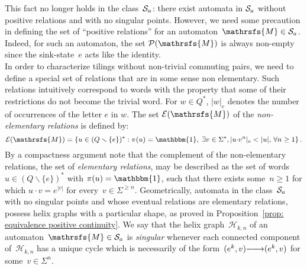\documentclass{amsart}
\begin{document}
{This fact no longer holds in the class~${\hbox{${\mathcal S}_{a}$}}$: there exist automata in ${\hbox{${\mathcal S}_{a}$}}$ without positive relations and with no singular points. However, we need some precaution in defining the set of
``positive relations'' for an automaton~${{{\mathrsfs{{M}}}}}\in{\hbox{${\mathcal S}_{a}$}}$.
Indeed, for such an automaton, the set 
${\mathcal{P}}({{{\mathrsfs{{M}}}}})$ is always non-empty since the sink-state~$e$ acts
like the identity. 
\\
In order to characterize tilings without non-trivial commuting pairs, we need to define a special set of relations that are in some sense non elementary. Such relations intuitively correspond to words with the property that some of their restrictions do not become the trivial word. For $w\in{{{Q}}}^{*} $, $|w|_{e}$ denotes the number of occurrences of the letter $e$ in $w$. The set $\mathcal{E}({{{\mathrsfs{{M}}}}})$ of the \emph{non-elementary relations} is defined by:
\[\mathcal{E}({{{\mathrsfs{{M}}}}})=\left\{u\in ({{{Q}}}\smallsetminus\{e\})^{*}: \pi(u)=\operatorname{\mathbbm{1}}, \;\exists v\in{{{\Sigma}}}^{*}, |u{{{\cdot}}} v^{n}|_{e}<|u|, \,\forall n\ge 1\right\}.\]
By a compactness argument note that the complement of the non-elementary relations, the set of \emph{elementary relations}, may be described as the set of words~$u\in ({{{Q}}}\smallsetminus\{e\})^{*}$ with $\pi(u)=\operatorname{\mathbbm{1}}$, such that there exists some~$n\ge 1$ for which $u{{{\cdot}}} v=e^{|v|}$ for every~$v\in {{{\Sigma}}}^{\ge n}$.
Geometrically, automata in the class~${\hbox{${\mathcal S}_{a}$}}$ with no singular points and whose eventual relations are elementary relations, possess helix graphs with a particular shape, as proved in Proposition~\ref{prop: equivalence positive continuity}. We
say that the helix graph~$\mathcal{H}_{k,n}$ of an automaton~${{{\mathrsfs{{M}}}}}\in{\hbox{${\mathcal S}_{a}$}}$ is \emph{singular} whenever each
connected component of~$\mathcal{H}_{k,n}$ has a unique cycle which is necessarily of the
form~$(e^{k}, v){\smash{\stackrel{\text{\tiny{${}$}}}{\relbar\joinrel\longrightarrow}}}(e^{k},v)$ for some~$v\in {{{\Sigma}}}^{n}$.

}
\end{document}
